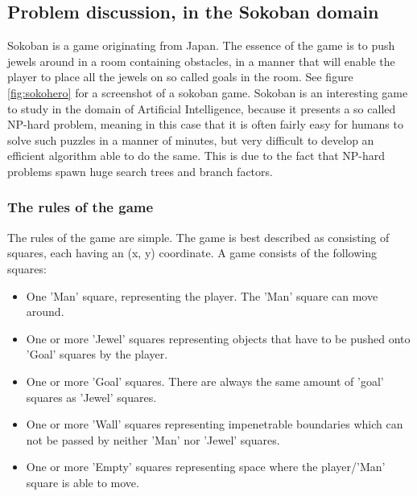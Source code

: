 \subsection{Problem discussion, in the Sokoban domain}
Sokoban is a game originating from Japan. The essence of the game is to push jewels around in a room containing obstacles, in a manner that will enable the player to place all the jewels on so called goals in the room. See figure \ref{fig:sokohero} for a screenshot of a sokoban game.
Sokoban is an interesting game to study in the domain of Artificial Intelligence, because it presents a so called NP-hard problem, meaning in this case that it is often fairly easy for humans to solve such puzzles in a manner of minutes, but very difficult to develop an efficient algorithm able to do the same. This is due to the fact that NP-hard problems spawn huge search trees and branch factors.

\subsubsection{The rules of the game}
The rules of the game are simple. The game is best described as consisting of squares, each having an (x, y) coordinate. A game consists of the following squares:
\begin{itemize}
\item One 'Man' square, representing the player. The 'Man' square can move around.
\item One or more 'Jewel' squares representing objects that have to be pushed onto 'Goal' squares by the player.
\item One or more 'Goal' squares. There are always the same amount of 'goal' squares as 'Jewel' squares.
\item One or more 'Wall' squares representing impenetrable boundaries which can not be passed by neither 'Man' nor 'Jewel' squares.
\item One or more 'Empty' squares representing space where the player/'Man' square is able to move. 
\end{itemize}

